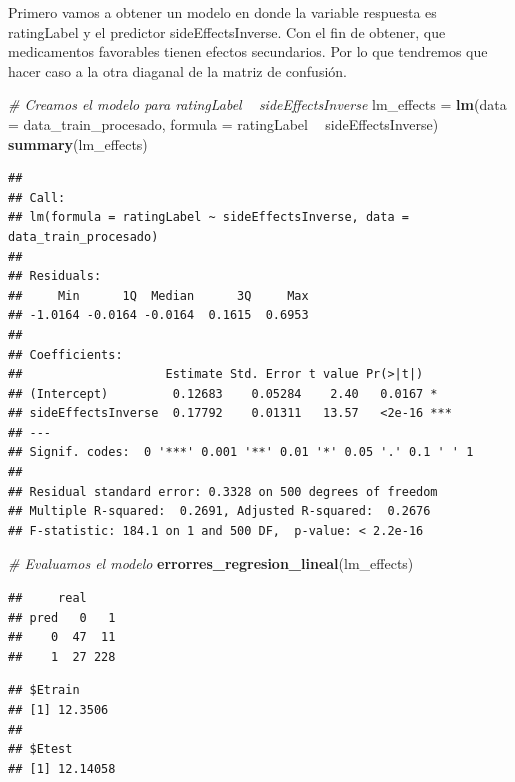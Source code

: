\documentclass[spanish,]{article}
\newenvironment{Shaded}{\begin{snugshade}}{\end{snugshade}}
\newcommand{\KeywordTok}[1]{\textcolor[rgb]{0.13,0.29,0.53}{\textbf{#1}}}
\newcommand{\DataTypeTok}[1]{\textcolor[rgb]{0.13,0.29,0.53}{#1}}
\newcommand{\StringTok}[1]{\textcolor[rgb]{0.31,0.60,0.02}{#1}}
\newcommand{\CommentTok}[1]{\textcolor[rgb]{0.56,0.35,0.01}{\textit{#1}}}
\newcommand{\OperatorTok}[1]{\textcolor[rgb]{0.81,0.36,0.00}{\textbf{#1}}}
\newcommand{\NormalTok}[1]{#1}
\begin{document}
Primero vamos a obtener un modelo en donde la variable respuesta es
ratingLabel y el predictor sideEffectsInverse. Con el fin de obtener,
que medicamentos favorables tienen efectos secundarios. Por lo que
tendremos que hacer caso a la otra diaganal de la matriz de confusión.

\begin{Shaded}
\begin{Highlighting}[]
\CommentTok{# Creamos el modelo para ratingLabel ~ sideEffectsInverse}
\NormalTok{lm_effects =}\StringTok{ }\KeywordTok{lm}\NormalTok{(}\DataTypeTok{data =}\NormalTok{ data_train_procesado, }\DataTypeTok{formula =}\NormalTok{ ratingLabel }\OperatorTok{~}\StringTok{ }\NormalTok{sideEffectsInverse)}
\KeywordTok{summary}\NormalTok{(lm_effects)}
\end{Highlighting}
\end{Shaded}

\begin{verbatim}
## 
## Call:
## lm(formula = ratingLabel ~ sideEffectsInverse, data = data_train_procesado)
## 
## Residuals:
##     Min      1Q  Median      3Q     Max 
## -1.0164 -0.0164 -0.0164  0.1615  0.6953 
## 
## Coefficients:
##                    Estimate Std. Error t value Pr(>|t|)    
## (Intercept)         0.12683    0.05284    2.40   0.0167 *  
## sideEffectsInverse  0.17792    0.01311   13.57   <2e-16 ***
## ---
## Signif. codes:  0 '***' 0.001 '**' 0.01 '*' 0.05 '.' 0.1 ' ' 1
## 
## Residual standard error: 0.3328 on 500 degrees of freedom
## Multiple R-squared:  0.2691, Adjusted R-squared:  0.2676 
## F-statistic: 184.1 on 1 and 500 DF,  p-value: < 2.2e-16
\end{verbatim}

\begin{Shaded}
\begin{Highlighting}[]
\CommentTok{# Evaluamos el modelo}
\KeywordTok{errorres_regresion_lineal}\NormalTok{(lm_effects)}
\end{Highlighting}
\end{Shaded}

\begin{verbatim}
##     real
## pred   0   1
##    0  47  11
##    1  27 228
\end{verbatim}

\begin{verbatim}
## $Etrain
## [1] 12.3506
## 
## $Etest
## [1] 12.14058
\end{verbatim}
\end{document}
